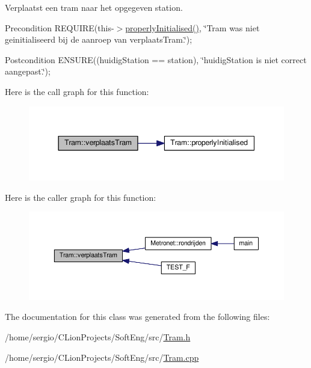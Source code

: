 Verplaatst een tram naar het opgegeven station. 

\begin{DoxyPrecond}{Precondition}
R\+E\+Q\+U\+I\+RE(this-\/$>$\hyperlink{class_tram_ac2688f590e4db232b4f535c9bf959efb}{properly\+Initialised()}, \char`\"{}\+Tram was niet geinitialiseerd bij de aanroep van verplaats\+Tram.\char`\"{}); 
\end{DoxyPrecond}
\begin{DoxyPostcond}{Postcondition}
E\+N\+S\+U\+RE((huidig\+Station == station), \char`\"{}huidig\+Station is niet correct aangepast.\char`\"{}); 
\end{DoxyPostcond}
Here is the call graph for this function\+:\nopagebreak
\begin{figure}[H]
\begin{center}
\leavevmode
\includegraphics[width=344pt]{class_tram_a8d55296c7ede4aa92c9b3a4b2a9495a8_cgraph}
\end{center}
\end{figure}
Here is the caller graph for this function\+:\nopagebreak
\begin{figure}[H]
\begin{center}
\leavevmode
\includegraphics[width=350pt]{class_tram_a8d55296c7ede4aa92c9b3a4b2a9495a8_icgraph}
\end{center}
\end{figure}


The documentation for this class was generated from the following files\+:\begin{DoxyCompactItemize}
\item 
/home/sergio/\+C\+Lion\+Projects/\+Soft\+Eng/src/\hyperlink{_tram_8h}{Tram.\+h}\item 
/home/sergio/\+C\+Lion\+Projects/\+Soft\+Eng/src/\hyperlink{_tram_8cpp}{Tram.\+cpp}\end{DoxyCompactItemize}
